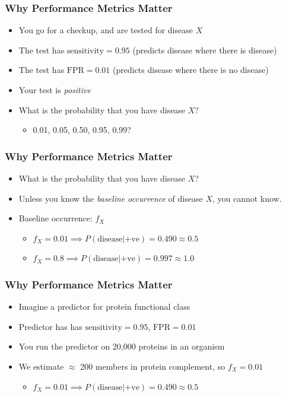 \documentclass[table]{beamer}
\begin{document}
    \begin{frame}
     \frametitle{Why Performance Metrics Matter}
     \begin{itemize}
       \item<1-> You go for a checkup, and are tested for disease $X$
       \item<1-> The test has $\text{sensitivity}=0.95$ (predicts disease where there is disease)
       \item<1-> The test has $\text{FPR}=0.01$ (predicts disease where there is no disease)
       \item<2-> Your test is \emph{positive}
       \item<2-> What is the probability that you have disease $X$?
       \begin{itemize}
         \item 0.01, 0.05, 0.50, 0.95, 0.99?
       \end{itemize}
     \end{itemize} 
   \end{frame}

    \begin{frame}
     \frametitle{Why Performance Metrics Matter}
     \begin{itemize}
       \item<1-> What is the probability that you have disease $X$?
       \item<1-> Unless you know the \emph{baseline occurrence} of disease $X$, you cannot know.
       \item<2-> Baseline occurrence: $f_X$
       \begin{itemize}
         \item $f_X = 0.01 \implies P(\text{disease}|\text{+ve}) = 0.490 \approx 0.5$
         \item $f_X = 0.8 \implies P(\text{disease}|\text{+ve}) = 0.997 \approx 1.0$         
       \end{itemize}
     \end{itemize} 
   \end{frame}

    \begin{frame}
     \frametitle{Why Performance Metrics Matter}
     \begin{itemize}
       \item<1-> Imagine a predictor for protein functional class
       \item<1-> Predictor has has $\text{sensitivity}=0.95$, $\text{FPR}=0.01$
       \item<1-> You run the predictor on 20,000 proteins in an organism
       \item<2-> We estimate $\approx$ 200 members in protein complement, so $f_X=0.01$
       \begin{itemize}
         \item $f_X = 0.01 \implies P(\text{disease}|\text{+ve}) = 0.490 \approx 0.5$
       \end{itemize}
     \end{itemize} 
   \end{frame}
\end{document}
